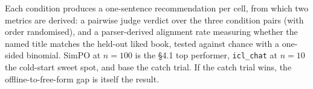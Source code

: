 Each condition produces a one-sentence recommendation per cell, from which two metrics are derived: a pairwise judge verdict over the three condition pairs (with order randomised), and a parser-derived alignment rate measuring whether the named title matches the held-out liked book, tested against chance with a one-sided binomial. SimPO at $n = 100$ is the \S4.1 top performer, \texttt{icl\_chat} at $n = 10$ the cold-start sweet spot, and base the catch trial. If the catch trial wins, the offline-to-free-form gap is itself the result.